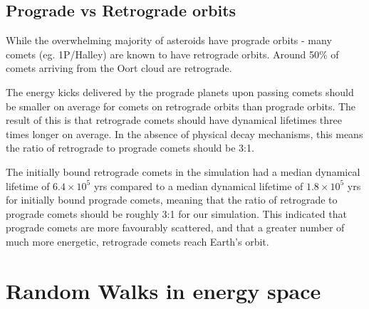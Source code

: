 \subsection{Prograde vs Retrograde orbits}

While the overwhelming majority of asteroids have prograde orbits - many comets (eg. 1P/Halley) are known to have retrograde orbits. Around 50\% of comets arriving from the Oort cloud are retrograde.

The energy kicks delivered by the prograde planets upon passing comets should be smaller on average for comets on retrograde orbits than prograde orbits. The result of this is that retrograde comets should have dynamical lifetimes three times longer on average. In the absence of physical decay mechanisms, this means the ratio of retrograde to prograde comets should be 3:1.%

The initially bound retrograde comets in the simulation had a median dynamical lifetime of $6.4\times10^5$ yrs compared to a median dynamical lifetime of $1.8\times10^5$ yrs for initially bound prograde comets, meaning that the ratio of retrograde to prograde comets should be roughly 3:1 for our simulation. This indicated that prograde comets are more favourably scattered, and that a greater number of much more energetic, retrograde comets reach Earth's orbit.


\section{Random Walks in energy space}

